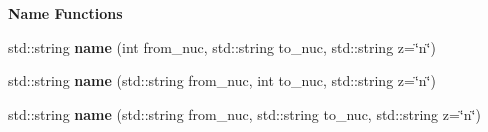 \begin{Indent}{\bf Name Functions}
\begin{DoxyCompactItemize}
\item 
std\+::string {\bfseries name} (int from\+\_\+nuc, std\+::string to\+\_\+nuc, std\+::string z=\char`\"{}n\char`\"{})\hypertarget{namespacepyne_1_1rxname_a462c6500c7bf221f8c897ad2cc5cf45f}{}\label{namespacepyne_1_1rxname_a462c6500c7bf221f8c897ad2cc5cf45f}

\item 
std\+::string {\bfseries name} (std\+::string from\+\_\+nuc, int to\+\_\+nuc, std\+::string z=\char`\"{}n\char`\"{})\hypertarget{namespacepyne_1_1rxname_aff733bd008ee84cde43ccfdd5f308472}{}\label{namespacepyne_1_1rxname_aff733bd008ee84cde43ccfdd5f308472}

\item 
std\+::string {\bfseries name} (std\+::string from\+\_\+nuc, std\+::string to\+\_\+nuc, std\+::string z=\char`\"{}n\char`\"{})\hypertarget{namespacepyne_1_1rxname_ad42b702d8b240b1605616d7c104f0bdc}{}\label{namespacepyne_1_1rxname_ad42b702d8b240b1605616d7c104f0bdc}

\end{DoxyCompactItemize}
\end{Indent}
